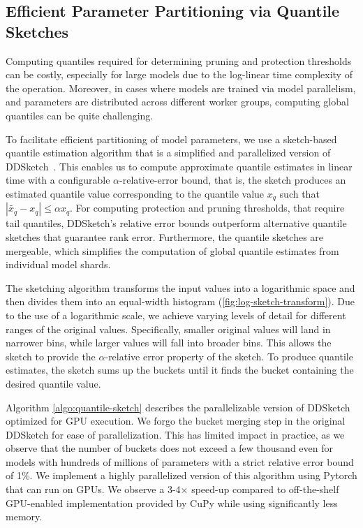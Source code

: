 \subsection{Efficient Parameter Partitioning via Quantile Sketches} 
\label{app:quantile}

Computing quantiles required for determining pruning and protection thresholds can be costly, especially for large models due to the log-linear time complexity of the operation. Moreover, in cases where models are trained via model parallelism, and parameters are distributed across different worker groups, computing global quantiles can be quite challenging. %


To facilitate efficient partitioning of model parameters, we use a sketch-based quantile estimation algorithm that is a simplified and parallelized version of DDSketch~\cite{ddsketch}. This enables us to compute approximate quantile estimates in linear time with a configurable $\alpha$-relative-error bound, that is, the sketch produces an estimated quantile value corresponding to the quantile value $x_q$ such that $|\tilde{x_q} - x_q| \leq \alpha x_q$. For computing protection and pruning thresholds, that require tail quantiles, DDSketch's relative error bounds outperform alternative quantile sketches that guarantee rank error. Furthermore, the quantile sketches are mergeable, which simplifies the computation of global quantile estimates from individual model shards.

The sketching algorithm transforms the input values into a logarithmic space and then divides them into an equal-width histogram (\cref{fig:log-sketch-transform}). Due to the use of a logarithmic scale, we achieve varying levels of detail for different ranges of the original values. Specifically, smaller original values will land in narrower bins, while larger values will fall into broader bins. This allows the sketch to provide the $\alpha$-relative error property of the sketch. To produce quantile estimates, the sketch sums up the buckets until it finds the bucket containing the desired quantile value.

Algorithm \ref{algo:quantile-sketch} describes the parallelizable version of DDSketch \cite{ddsketch} optimized for GPU execution. We forgo the bucket merging step in the original DDSketch for ease of parallelization. This has limited impact in practice, as we observe that the number of buckets does not exceed a few thousand even for models with hundreds of millions of parameters with a strict relative error bound of 1\%. We implement a highly parallelized version of this algorithm using Pytorch that can run on GPUs. We observe a 3-4$\times$ speed-up compared to off-the-shelf GPU-enabled implementation provided by CuPy \cite{cupy} while using significantly less memory.

